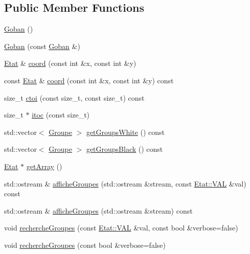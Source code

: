\subsection*{Public Member Functions}
\begin{DoxyCompactItemize}
\item 
\hyperlink{class_goban_a3544d30f54fbb54bd9e4fed08aa4bce6}{Goban} ()
\item 
\hyperlink{class_goban_a8c49da36e406f11d33671a4c8a4c19b2}{Goban} (const \hyperlink{class_goban}{Goban} \&)
\item 
\hyperlink{class_etat}{Etat} \& \hyperlink{class_goban_a29aaf8df380fe614845d48cba057747c}{coord} (const int \&x, const int \&y)
\item 
const \hyperlink{class_etat}{Etat} \& \hyperlink{class_goban_ac674775d4101d921257acc21cfec935c}{coord} (const int \&x, const int \&y) const
\item 
size\+\_\+t \hyperlink{class_goban_a579840586df08a58983f6b497979344b}{ctoi} (const size\+\_\+t, const size\+\_\+t) const
\item 
size\+\_\+t $\ast$ \hyperlink{class_goban_aa2aaa3b4db4549d169bd0ff234d601cb}{itoc} (const size\+\_\+t)
\item 
std\+::vector$<$ \hyperlink{class_groupe}{Groupe} $>$ \hyperlink{class_goban_a0d5ecea357ff85e7d08f2c0855d83e6b}{get\+Groups\+White} () const
\item 
std\+::vector$<$ \hyperlink{class_groupe}{Groupe} $>$ \hyperlink{class_goban_a0a8ed1098b25c0c42cb5faadaa0605d4}{get\+Groups\+Black} () const
\item 
\hyperlink{class_etat}{Etat} $\ast$ \hyperlink{class_goban_a6b13aeeebc07fddc6a0e4557b90adc7d}{get\+Array} ()
\item 
std\+::ostream \& \hyperlink{class_goban_aefd43ab2cf0746f2f8c653d825bf080c}{affiche\+Groupes} (std\+::ostream \&stream, const \hyperlink{class_etat_af3ddb2296ffc379b7f3ad2bf832f294e}{Etat\+::\+V\+AL} \&val) const
\item 
std\+::ostream \& \hyperlink{class_goban_a8d5df6cd74b0240f36a4056f045625b7}{affiche\+Groupes} (std\+::ostream \&stream) const
\item 
void \hyperlink{class_goban_a8584a53688e7bcf9de7c4cf48454acdc}{recherche\+Groupes} (const \hyperlink{class_etat_af3ddb2296ffc379b7f3ad2bf832f294e}{Etat\+::\+V\+AL} \&val, const bool \&verbose=false)
\item 
void \hyperlink{class_goban_abd6663ff5c440bf6def073db02df83f0}{recherche\+Groupes} (const bool \&verbose=false)
\item 

\end{DoxyCompactItemize}
